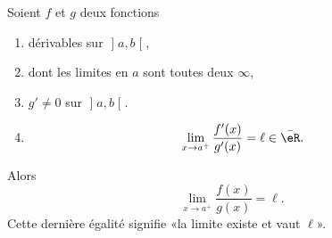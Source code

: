\begin{proposition}      \label{PROPooTJVCooMeUhIy}
	Soient \( f\) et \( g\) deux fonctions
	\begin{enumerate}
		\item
		      dérivables sur \( \mathopen] a , b \mathclose[\),
		\item
		      dont les limites en \( a\) sont toutes deux \( \infty\),
		\item
		      \( g'\neq 0\) sur \( \mathopen] a , b \mathclose[\).
		\item
		      \begin{equation}        \label{EQooVFYCooMjOGtI}
			      \lim_{x\to a^+} \frac{ f'(x) }{ g'(x) }=\ell\in \bar \eR.
		      \end{equation}
	\end{enumerate}
	Alors
	\begin{equation}
		\lim_{x\to a^+} \frac{ f(x) }{ g(x) }=\ell.
	\end{equation}
	Cette dernière égalité signifie «la limite existe et vaut \( \ell\)».
\end{proposition}

